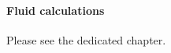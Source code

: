 \documentclass[11pt,a4paper]{report}
\begin{document}
\paragraph{Fluid calculations}
Please see the dedicated chapter. 
%		
%		
%	
\end{document}
